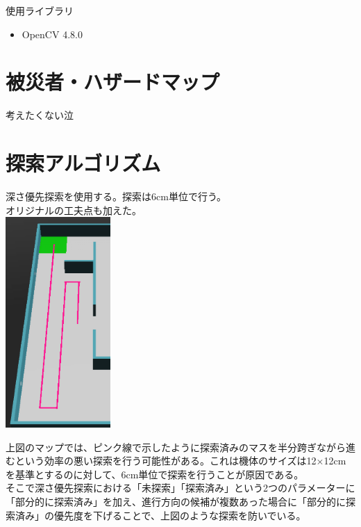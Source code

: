 \documentclass[dvipdfmx,a4paper]{jsarticle}
\begin{document}
  \noindent
  使用ライブラリ
  \begin{itemize}
    \item OpenCV 4.8.0
  \end{itemize}

  \section{被災者・ハザードマップ}
  考えたくない泣

  \section{探索アルゴリズム}
  深さ優先探索を使用する。探索は6cm単位で行う。\\
  オリジナルの工夫点も加えた。\\
  \includegraphics[width=40mm]{Photo/feagure1.png}

  上図のマップでは、ピンク線で示したように探索済みのマスを半分跨ぎながら進むという効率の悪い探索を行う可能性がある。これは機体のサイズは12$\times$12cmを基準とするのに対して、6cm単位で探索を行うことが原因である。\\
  そこで深さ優先探索における「未探索」「探索済み」という2つのパラメーターに「部分的に探索済み」を加え、進行方向の候補が複数あった場合に「部分的に探索済み」の優先度を下げることで、上図のような探索を防いでいる。\\
\end{document}
